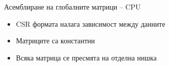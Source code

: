 \documentclass{beamer}
\begin{document}

\begin{frame}{Асемблиране на глобалните матрици -- CPU}
	\begin{itemize}
		\item CSR формата налага зависимост между данните
		\item Матриците са константни
		\item Всяка матрица се пресмята на отделна нишка
	\end{itemize}
\end{frame}
\end{document}
